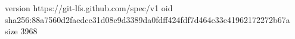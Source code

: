 version https://git-lfs.github.com/spec/v1
oid sha256:88a7560d2faedcc31d08e9d3389da0fdff424fdf7d464c33e41962172272b67a
size 3968
